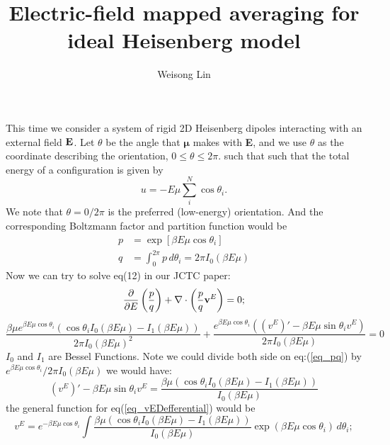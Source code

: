 \documentclass[11pt,reqno]{amsart}
\title{Electric-field mapped averaging for ideal Heisenberg model}
\author{Weisong Lin}
\date{}                                           %
\begin{document}
\maketitle

This time we consider a system of rigid 2D Heisenberg dipoles
interacting with an external field $\bf{E}$. Let $\theta$ be the angle that $\boldsymbol \mu$ makes with {\bf E}, and we use $\theta$ as the coordinate describing the orientation, $0 \le \theta \le 2\pi$. such that such that the total energy of a configuration is given by
\begin{equation}
u = -E\mu\sum_i^N \cos\theta_i.
\end{equation}
We note that $\theta = 0/2\pi$ is the preferred (low-energy) orientation. And the corresponding Boltzmann factor and partition function would be
\begin{align}
p&=\exp[\beta  E \mu  \cos\theta_i] \nonumber \\  
q&=\int_0^{2 \pi } p \, d\theta_i = 2 \pi  I_0(\beta  E \mu )
\end{align} 
Now we can try to solve eq(12) in our JCTC paper:
\begin{equation}
\frac{\partial }{\partial E}\left(\frac{p}{q}\right)+\nabla\cdot\left(\frac{p}{q}{\bf v}^{E}\right)=0;
\end{equation}
\begin{equation}
\label{eq_pq}
\frac{\beta  \mu  e^{\beta  E \mu  \cos \theta _i} \left(\cos \theta _i I_0(\beta  E \mu )-I_1(\beta  E \mu )\right)}{2 \pi  I_0(\beta  E \mu )^2}+\frac{e^{\beta  E \mu  \cos \theta _i} \left(\left(v^E\right)'-\beta  E \mu   \sin \theta _i v^E\right)}{2 \pi  I_0(\beta  E \mu )}=0
\end{equation}
$I_0$ and $I_1$ are Bessel Functions. Note we could divide both side on eq:(\ref{eq_pq}) by  $e^{\beta  E \mu  \cos \theta _i}/ 2 \pi  I_0(\beta  E \mu )$  we would have:
\begin{equation}
\label{eq_vEDefferential}
\left(v^E\right)' -\beta  E \mu   \sin \theta _i v^E=\frac{\beta  \mu  \left(\cos \theta _i I_0(\beta  E \mu )-I_1(\beta  E \mu )\right)}{  I_0(\beta  E \mu )}
\end{equation}
the general function for eq(\ref{eq_vEDefferential}) would be
\begin{equation}
v^E=e^{-\beta  E \mu  \cos\theta_i} \int \frac{\beta  \mu  \left(\cos \theta _i I_0(\beta  E \mu )-I_1(\beta  E \mu )\right)}{  I_0(\beta  E \mu )} \exp (\beta  E \mu  \cos\theta_i) \, d\theta_i;
\end{equation}
\end{document}
